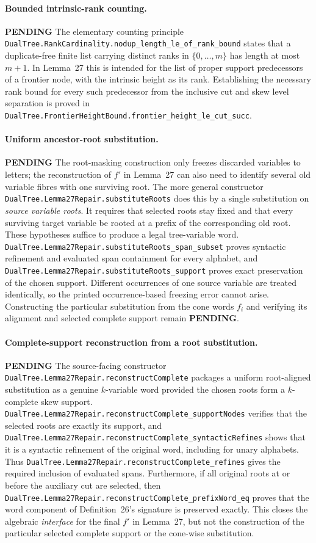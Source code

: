 \documentclass[11pt]{article}
\newcommand{\todo}{\textcolor{gray!70!black}{\textbf{PENDING}}}
\newcommand{\lean}[1]{\texttt{#1}}
\begin{document}
\paragraph{Bounded intrinsic-rank counting.} \todo
The elementary counting principle
\lean{DualTree.RankCardinality.nodup_length_le_of_rank_bound}
states that a duplicate-free finite list carrying distinct ranks
in $\{0,\ldots,m\}$ has length at most $m+1$.  In Lemma~27 this is
intended for the list of proper support predecessors of a frontier
node, with the intrinsic height as its rank.  Establishing the
necessary rank bound for every such predecessor from the inclusive
cut and skew level separation is proved in
\lean{DualTree.FrontierHeightBound.frontier_height_le_cut_succ}.

\paragraph{Uniform ancestor-root substitution.} \todo
The root-masking construction only freezes discarded variables to
letters; the reconstruction of $f'$ in Lemma~27 can also need to
identify several old variable fibres with one surviving root.
The more general constructor
\lean{DualTree.Lemma27Repair.substituteRoots}
does this by a single substitution on \emph{source variable roots}.
It requires that selected roots stay fixed and that every surviving
target variable be rooted at a prefix of the corresponding old root.
These hypotheses suffice to produce a legal tree-variable word.
\lean{DualTree.Lemma27Repair.substituteRoots_span_subset}
proves syntactic refinement and evaluated span containment for
every alphabet, and
\lean{DualTree.Lemma27Repair.substituteRoots_support}
proves exact preservation of the chosen support.  Different
occurrences of one source variable are treated identically, so the
printed occurrence-based freezing error cannot arise.
Constructing the particular substitution from the cone words $f_i$
and verifying its alignment and selected complete support remain
\todo.

\paragraph{Complete-support reconstruction from a root substitution.} \todo
The source-facing constructor
\lean{DualTree.Lemma27Repair.reconstructComplete} packages a
uniform root-aligned substitution as a genuine $k$-variable word
provided the chosen roots form a $k$-complete skew support.
\lean{DualTree.Lemma27Repair.reconstructComplete_supportNodes}
verifies that the selected roots are exactly its support, and
\lean{DualTree.Lemma27Repair.reconstructComplete_syntacticRefines}
shows that it is a syntactic refinement of the original word,
including for unary alphabets.  Thus
\lean{DualTree.Lemma27Repair.reconstructComplete_refines}
gives the required inclusion of evaluated spans.
Furthermore, if all original roots at or before the auxiliary cut
are selected, then
\lean{DualTree.Lemma27Repair.reconstructComplete_prefixWord_eq}
proves that the word component of Definition~26's signature is
preserved exactly.  This closes the algebraic \emph{interface} for
the final $f'$ in Lemma~27, but not the construction of the
particular selected complete support or the cone-wise substitution.
\end{document}
